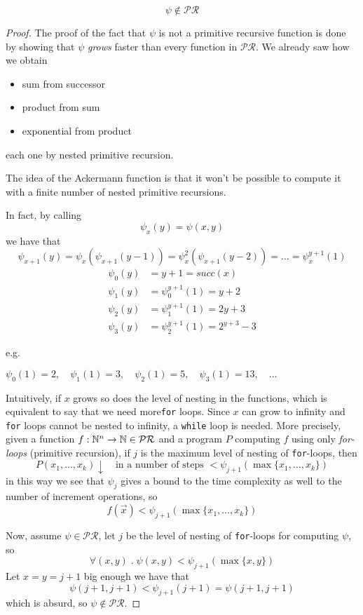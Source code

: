 \begin{theorem}
  \[ \psi \notin \mathcal{PR} \]
  \begin{proof}
    The proof of the fact that $\psi$ is not a primitive recursive
    function is done by showing that $\psi$ \emph{grows} faster than
    every function in $\mathcal{PR}$. We already saw how we obtain
    \begin{itemize}
    \item sum from successor
    \item product from sum
    \item exponential from product
    \end{itemize}
    each one by nested primitive recursion.

    The idea of the Ackermann function is that it won't be possible to compute it with a finite number of
    nested primitive recursions.

    In fact, by calling \[\psi_x(y) = \psi(x,y)\] we have
    that
    \[
      \psi_{x+1}(y) = \psi_x(\psi_{x+1}(y-1)) =
      \psi^2_{x}(\psi_{x+1}(y-2)) = \dots = \psi_x^{y+1}(1)
    \]
    \begin{align*}
      \psi_0(y) &= y+1 = succ(x)\\
      \psi_1(y) &= \psi_0^{y+1}(1) = y+2\\
      \psi_2(y) &= \psi_1^{y+1}(1) = 2y+3\\
      \psi_3(y) &= \psi_2^{y+1}(1) = 2^{y+3}-3
    \end{align*}

    e.g.

    \(\psi_0(1) = 2, \quad \psi_1(1) = 3, \quad \psi_2(1) = 5, \quad
    \psi_3(1) = 13, \quad \dots\)

    Intuitively, if $x$ grows so does the level of nesting
    in the functions, which is equivalent to say that we need more\texttt{for} loops. 
    Since $x$ can grow to infinity and
    \texttt{for} loops cannot be nested to infinity, a \texttt{while}
    loop is needed. More precisely, given a
    function $f :\mathbb{N}^n \to \mathbb{N} \in \mathcal{PR}$ and a program $P$ computing $f$ using only
    \emph{for-loops} (primitive recursion),
    if $j$ is the maximum level of nesting of \texttt{for}-loops, then
    \[
      P(x_1, \dots, x_k)\downarrow \quad \text{in a number of steps }
      < \psi_{j+1}(\max\{x_1, \dots, x_k\})
    \]
    in this way we see that $\psi_j$ gives a bound to the time complexity
    as well to the number of increment operations, so
    \[f(\vec{x}) < \psi_{j+1}(\max\{x_1, \dots, x_k\})\]

    Now, assume $\psi \in \mathcal{PR}$, let $j$ be the
    level of nesting of \texttt{for}-loops for computing $\psi$, so 
    \[\forall (x,y)\;.\;\psi(x,y) < \psi_{j+1}(\max\{x,y\})\]
    Let $x=y=j+1$ big enough we have
    that \[\psi(j+1,j+1) < \psi_{j+1}(j+1) = \psi(j+1,j+1)\] which is
    absurd, so $\psi \notin \mathcal{PR}$.
  \end{proof}
\end{theorem}

